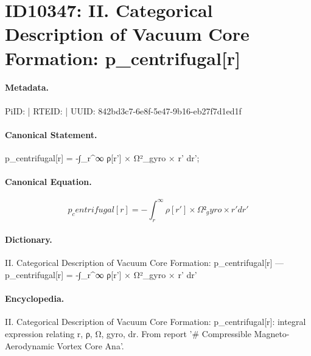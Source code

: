 \section*{ID10347: II. Categorical Description of Vacuum Core Formation: p\_centrifugal[r]}
\paragraph{Metadata.}
PiID:  | RTEID:  | UUID: 842bd3c7-6e8f-5e47-9b16-eb27f7d1ed1f

\paragraph{Canonical Statement.}
p\_centrifugal[r] = -∫\_r\textasciicircum{}∞ ρ[r'] × Ω²\_gyro × r' dr';

\paragraph{Canonical Equation.}
\[
p_centrifugal[r] = -∫_r^∞ ρ[r'] × Ω²_gyro × r' dr'
\]

\paragraph{Dictionary.}
II. Categorical Description of Vacuum Core Formation: p\_centrifugal[r] — p\_centrifugal[r] = -∫\_r\textasciicircum{}∞ ρ[r'] × Ω²\_gyro × r' dr'

\paragraph{Encyclopedia.}
II. Categorical Description of Vacuum Core Formation: p\_centrifugal[r]: integral expression relating r, ρ, Ω, gyro, dr. From report '\# Compressible Magneto-Aerodynamic Vortex Core Ana'.
